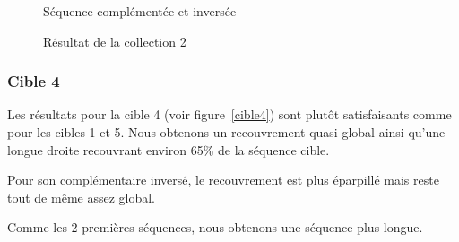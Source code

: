 \begin{figure}[!ht]
\begin{minipage}[c]{.46 \linewidth}
\begin{center}
			 Séquence complémentée et inversée
		\end{center}
	\end{minipage}
	\caption{Résultat de la collection 2}
	\label{cible2}
\end{figure}

\FloatBarrier

\subsubsection*{Cible 4}

Les résultats pour la cible 4 (voir figure~\ref{cible4}) sont plutôt satisfaisants comme pour les cibles 1
et 5. Nous obtenons un recouvrement quasi-global ainsi qu'une longue droite
recouvrant environ 65\% de la séquence cible.

Pour son complémentaire inversé, le recouvrement est plus éparpillé mais reste
tout de même assez global.

Comme les 2 premières séquences, nous obtenons une séquence plus longue.


